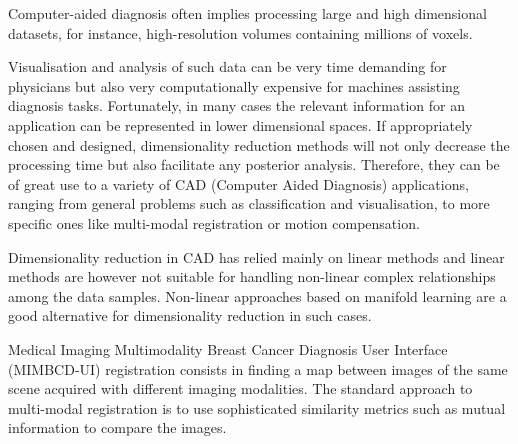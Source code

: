 Computer-aided  diagnosis  often  implies  processing large and high dimensional datasets, for instance, high-resolution volumes containing millions of voxels.

Visualisation and analysis of such data can be very time demanding for physicians but also very computationally expensive for machines assisting diagnosis tasks. Fortunately, in many cases the relevant information for an application can be represented in lower dimensional spaces. If appropriately  chosen and designed, dimensionality reduction methods will not only decrease the processing time but also facilitate any posterior analysis. Therefore, they can be of great use to a variety of CAD (Computer Aided Diagnosis)  applications, ranging  from  general problems such as classification and visualisation, to more specific ones like multi-modal registration or motion compensation.

Dimensionality reduction in CAD has relied mainly on linear methods and linear  methods  are  however not suitable for handling non-linear complex relationships among the data samples. Non-linear approaches based on manifold learning are a good alternative for dimensionality reduction in such cases.

Medical Imaging Multimodality Breast Cancer Diagnosis User Interface (MIMBCD-UI)  registration  consists  in  finding  a map between images of the same scene acquired with different imaging modalities. The standard approach to multi-modal registration is to use sophisticated similarity metrics such as mutual information to compare the images.
